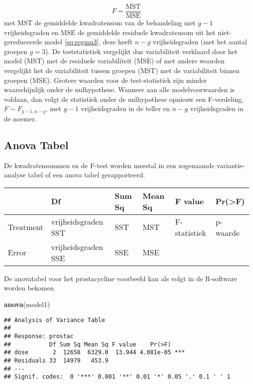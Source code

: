 \documentclass[12pt,dutch,coursenotes]{book}
\newenvironment{Shaded}{\begin{snugshade}}{\end{snugshade}}
\newcommand{\KeywordTok}[1]{\textcolor[rgb]{0.13,0.29,0.53}{\textbf{#1}}}
\newcommand{\NormalTok}[1]{#1}
\theoremstyle{definition}
\theoremstyle{definition}
\theoremstyle{definition}
\theoremstyle{remark}
\begin{document}
\[F = \frac{\text{MST}}{\text{MSE}}\] met \(\text{MST}\) de gemiddelde
kwadratensom van de behandeling met \(g-1\) vrijheidsgraden en
\(\text{MSE}\) de gemiddelde residuele kwadratensom uit het
niet-gereduceerde model \eqref{eq:regmu3}, deze heeft \(n-g\)
vrijheidsgraden (met het aantal groepen \(g=3\)). De teststatistiek
vergelijkt dus variabiliteit verklaard door het model (MST) met de
residuele variabiliteit (MSE) of met andere woorden vergelijkt het de
variabiliteit tussen groepen (MST) met de variabiliteit binnen groepen
(MSE). Grotere waarden voor de test-statistiek zijn minder
waarschijnlijk onder de nulhypothese. Wanneer aan alle modelvoorwaarden
is voldaan, dan volgt de statistiek onder de nulhypothese opnieuw een
F-verdeling, \(F \sim F_{g-1,n-g}\), met \(g-1\) vrijheidsgraden in de
teller en \(n-g\) vrijheidsgraden in de noemer.

\subsection{Anova Tabel}\label{anova-tabel-1}

De kwadratensommen en de F-test worden meestal in een zogenaamde
variantie-analyse tabel of een anova tabel gerapporteerd.

\begin{longtable}[]{@{}llllll@{}}
\toprule
& Df & Sum Sq & Mean Sq & F value & Pr(\textgreater{}F)\tabularnewline
\midrule
\endhead
Treatment & vrijheidsgraden SST & SST & MST & F-statistiek &
p-waarde\tabularnewline
Error & vrijheidsgraden SSE & SSE & MSE & &\tabularnewline
\bottomrule
\end{longtable}

De anovatabel voor het prostacycline voorbeeld kan als volgt in de
R-software worden bekomen

\begin{Shaded}
\begin{Highlighting}[]
\KeywordTok{anova}\NormalTok{(model1)}
\end{Highlighting}
\end{Shaded}

\begin{verbatim}
## Analysis of Variance Table
## 
## Response: prostac
##           Df Sum Sq Mean Sq F value    Pr(>F)    
## dose       2  12658  6329.0  13.944 4.081e-05 ***
## Residuals 33  14979   453.9                      
## ---
## Signif. codes:  0 '***' 0.001 '**' 0.01 '*' 0.05 '.' 0.1 ' ' 1
\end{verbatim}
\end{document}
